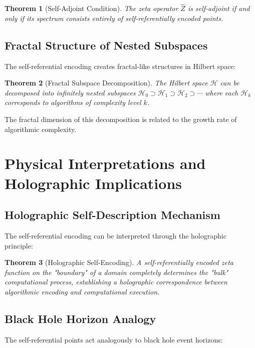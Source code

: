 \documentclass[12pt]{article}
\theoremstyle{plain}
\newtheorem{theorem}{Theorem}[section]
\theoremstyle{definition}
\newcommand{\cH}{\mathcal{H}}
\begin{document}
\begin{theorem}[Self-Adjoint Condition]
The zeta operator $\hat{Z}$ is self-adjoint if and only if its spectrum consists entirely of self-referentially encoded points.
\end{theorem}

\subsection{Fractal Structure of Nested Subspaces}

The self-referential encoding creates fractal-like structures in Hilbert space:

\begin{theorem}[Fractal Subspace Decomposition]
The Hilbert space $\cH$ can be decomposed into infinitely nested subspaces $\cH_0 \supset \cH_1 \supset \cH_2 \supset \cdots$ where each $\cH_k$ corresponds to algorithms of complexity level $k$.
\end{theorem}

The fractal dimension of this decomposition is related to the growth rate of algorithmic complexity.

\section{Physical Interpretations and Holographic Implications}

\subsection{Holographic Self-Description Mechanism}

The self-referential encoding can be interpreted through the holographic principle:

\begin{theorem}[Holographic Self-Encoding]
A self-referentially encoded zeta function on the "boundary" of a domain completely determines the "bulk" computational process, establishing a holographic correspondence between algorithmic encoding and computational execution.
\end{theorem}

\subsection{Black Hole Horizon Analogy}

The self-referential points act analogously to black hole event horizons:
\end{document}
